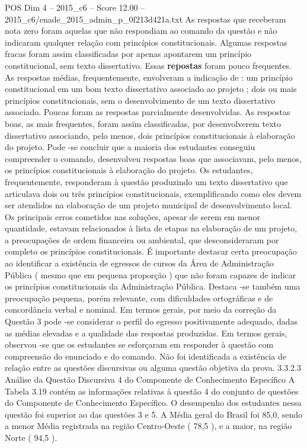 \begin{textsample}{POS Dim 4 – 2015\_c6 – Score 12.00 – 2015\_c6/enade\_2015\_admin\_p\_0f213d421a.txt}
As respostas que receberam nota zero foram aquelas que não respondiam ao comando da questão e não indicaram qualquer relação com princípios constitucionais.
Algumas respostas fracas foram assim classificadas por apenas apontarem um princípio constitucional, sem texto dissertativo.
Essas \textbf{repostas} foram pouco frequentes.
As respostas médias, frequentemente, envolveram a indicação de : um princípio constitucional em um bom texto dissertativo associado ao projeto ; dois ou mais princípios constitucionais, sem o desenvolvimento de um texto dissertativo associado.
Poucas foram as respostas parcialmente desenvolvidas.
As respostas boas, as mais frequentes, foram assim classificadas, por desenvolverem texto dissertativo associando, pelo menos, dois princípios constitucionais à elaboração do projeto.
Pode -se concluir que a maioria dos estudantes conseguiu compreender o comando, desenvolveu respostas boas que associavam, pelo menos, os princípios constitucionais à elaboração do projeto.
Os estudantes, frequentemente, responderam à questão produzindo um texto dissertativo que articulava dois ou três princípios constitucionais, exemplificando como eles devem ser atendidos na elaboração de um projeto municipal de desenvolvimento local.
Os principais erros cometidos nas soluções, apesar de serem em menor quantidade, estavam relacionados à lista de etapas na elaboração de um projeto, a preocupações de ordem financeira ou ambiental, que desconsideraram por completo os princípios constitucionais.
É importante destacar certa preocupação ao identificar a existência de egressos de cursos da Área de Administração Pública ( mesmo que em pequena proporção ) que não foram capazes de indicar os princípios constitucionais da Administração Pública.
Destaca -se também uma preocupação pequena, porém relevante, com dificuldades ortográficas e de concordância verbal e nominal.
Em termos gerais, por meio da correção da Questão 3 pode -se considerar o perfil do egresso positivamente adequado, dadas as médias elevadas e a qualidade das respostas produzidas.
Em termos gerais, observou -se que os estudantes se esforçaram em responder à questão com compreensão do enunciado e do comando.
Não foi identificada a existência de relação entre as questões discursivas ou alguma questão objetiva da prova. 3.3.2.3 Análise da Questão Discursiva 4 do Componente de Conhecimento Específico A Tabela 3.19 contém as informações relativas à questão 4 do conjunto de questões do Componente de Conhecimento Específico.
O desempenho dos estudantes nessa questão foi superior ao das questões 3 e 5.
A Média geral do Brasil foi 85,0, sendo a menor Média registrada na região Centro-Oeste ( 78,5 ), e a maior, na região Norte ( 94,5 ).

\end{textsample}
